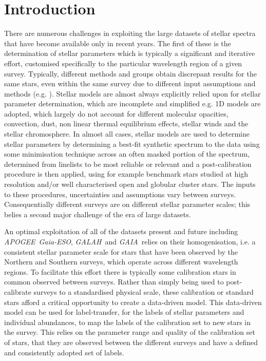 \documentclass[12pt, preprint]{aastex}
\newcommand{\apogee}{\textsl{APOGEE}}
\newcommand{\galah}{\textsl{GALAH}}
\newcommand{\gaiaeso}{\textsl{Gaia-ESO}}
\newcommand{\gaia}{\textsl{GAIA}}
\begin{document}

\section{Introduction}

There are numerous challenges in exploiting the large datasets of stellar spectra that have become available only in recent years. The first of these is the determination of stellar parameters which is typically a significant and iterative effort, customised specifically to the particular wavelength region of a given survey. Typically, different methods and groups obtain discrepant results for the same stars, even within the same survey due to different input assumptions and methods (e.g. \citep{Sm2014}). Stellar models are almost always explicitly relied upon for stellar parameter determination, which are incomplete and simplified e.g. 1D models are adopted, which  largely do not account for different molecular opacities, convection, dust, non linear thermal equilibrium effects, stellar winds and the stellar chromosphere. In almost all cases, stellar models are used to determine stellar parameters by determining a best-fit synthetic spectrum to the data using some minimisation technique across an often masked portion of the spectrum, determined from linelists to be most reliable or relevant and a post-calibration procedure is then applied, using for example benchmark stars studied at high resolution and/or well characterised open and globular cluster stars. The inputs to these procedures, uncertainties and assumptions vary between surveys. Consequentially different surveys are on different stellar parameter scales; this belies a second major challenge of the era of large datasets. 


An optimal exploitation of all of the datasets present and future including \apogee\, \gaiaeso, \galah\ and \gaia\ relies on their homogenisation, i.e. a consistent stellar parameter scale for stars that have been observed by the Northern and Southern surveys, which operate across different wavelength regions. To facilitate this effort there is typically some calibration stars in common observed between surveys. Rather than simply being used to post-calibrate surveys to a standardised physical scale, these calibration or standard stars afford a critical opportunity to create a data-driven model.  This data-driven model can be used for label-transfer, for the labels of stellar parameters and individual abundances, to map the labels of the calibration set to new stars in the survey. This relies on the parameter range and quality of the calibration set of stars, that they are observed between the different surveys and have a defined and consistently adopted set of labels. 
\end{document}
